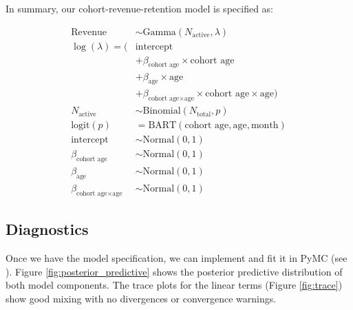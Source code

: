 \documentclass[11pt]{amsart}
\theoremstyle{definition}
\begin{document}
In summary, our cohort-revenue-retention model is specified as:

\begin{align*}
    \text{Revenue}                              & \sim \text{Gamma}(N_{\text{active}}, \lambda)                                             \\
    \log(\lambda) = (                           & \text{intercept}                                                                          \\
                                                & + \beta_{\text{cohort age}} \times \text{cohort age}                                      \\
                                                & + \beta_{\text{age}} \times \text{age}                                                    \\
                                                & + \beta_{\text{cohort age} \times \text{age}} \times \text{cohort age} \times \text{age}) \\
    N_{\text{active}}                           & \sim \text{Binomial}(N_{\text{total}}, p)                                                 \\
    \textrm{logit}(p)                           & = \text{BART}(\text{cohort age}, \text{age}, \text{month})                                \\
    \text{intercept}                            & \sim \text{Normal}(0, 1)                                                                  \\
    \beta_{\text{cohort age}}                   & \sim \text{Normal}(0, 1)                                                                  \\
    \beta_{\text{age}}                          & \sim \text{Normal}(0, 1)                                                                  \\
    \beta_{\text{cohort age} \times \text{age}} & \sim \text{Normal}(0, 1)
\end{align*}

\subsection{Diagnostics}

Once we have the model specification, we can implement and fit it in PyMC (see \cite{orduz_revenue_retention}). Figure
\ref{fig:posterior_predictive} shows the posterior predictive distribution of both model components. The trace plots for the
linear terms (Figure \ref{fig:trace}) show good mixing with no divergences or convergence warnings.
\end{document}
